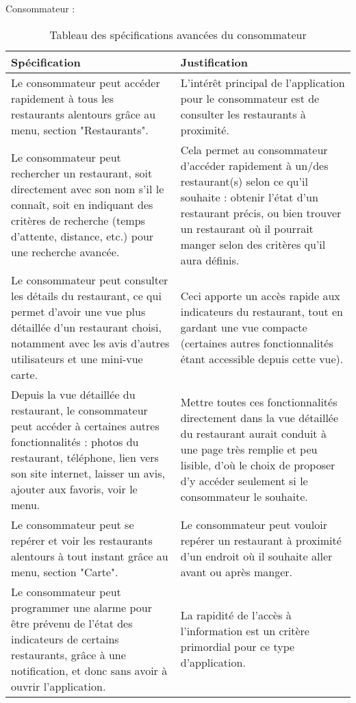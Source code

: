 Consommateur : \\
\begin{table}[H]
    \centering
    \caption{Tableau des spécifications avancées du consommateur}
    \label{min-spec-table}
    \begin{tabular}{p{8cm}|p{8cm}}
 	\bf{Spécification} & \bf{Justification} \\ \hline
            Le consommateur peut accéder rapidement à tous les restaurants alentours grâce au menu, section "Restaurants". & L'intérêt principal de l'application pour le consommateur est de consulter les restaurants à proximité. \\ \hline
            Le consommateur peut rechercher un restaurant, soit directement avec son nom s'il le connaît, soit en indiquant des critères de recherche (temps d'attente, distance, etc.) pour une recherche avancée. & Cela permet au consommateur d'accéder rapidement à un/des restaurant(s) selon ce qu'il souhaite : obtenir l'état d'un restaurant précis, ou bien trouver un restaurant où il pourrait manger selon des critères qu'il aura définis. \\ \hline
            Le consommateur peut consulter les détails du restaurant, ce qui permet d'avoir une vue plus détaillée d'un restaurant choisi, notamment avec les avis d'autres utilisateurs et une mini-vue carte. & Ceci apporte un accès rapide aux indicateurs du restaurant, tout en gardant une vue compacte (certaines autres fonctionnalités étant accessible depuis cette vue). \\ \hline
            Depuis la vue détaillée du restaurant, le consommateur peut accéder à certaines autres fonctionnalités : photos du restaurant, téléphone, lien vers son site internet, laisser un avis, ajouter aux favoris, voir le menu. & Mettre toutes ces fonctionnalités directement dans la vue détaillée du restaurant aurait conduit à une page très remplie et peu lisible, d'où le choix de proposer d'y accéder seulement si le consommateur le souhaite. \\ \hline
            Le consommateur peut se repérer et voir les restaurants alentours à tout instant grâce au menu, section "Carte". & Le consommateur peut vouloir repérer un restaurant à proximité d'un endroit où il souhaite aller avant ou après manger. \\ \hline
            Le consommateur peut programmer une alarme pour être prévenu de l'état des indicateurs de certains restaurants, grâce à une notification, et donc sans avoir à ouvrir l'application. & La rapidité de l'accès à l'information est un critère primordial pour ce type d'application. \\
    \end{tabular}
\end{table}

